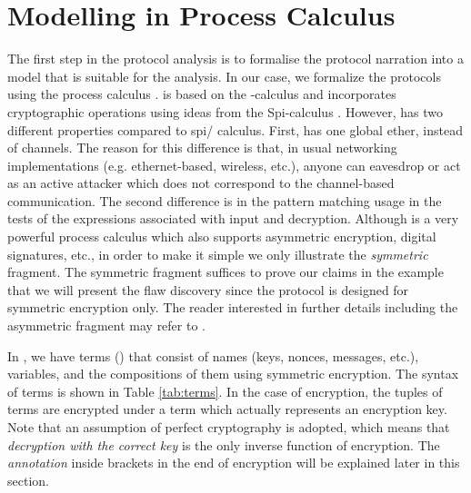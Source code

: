 \section{Modelling in \LYSA Process Calculus}
\label{lys}
The first step in the protocol analysis is to formalise the protocol
narration into a model that is suitable for the analysis.
In our case, we formalize the protocols using the \LYSA process calculus \cite{bod:1}. 
\LYSA is based on the -calculus \cite{mil} and incorporates cryptographic operations using ideas from the Spi-calculus \cite{aba:gor}. 
However, \LYSA has two different properties compared to spi/ calculus. 
First, \LYSA has one global ether, instead of channels. 
The reason for this difference is that, in usual networking implementations (e.g. ethernet-based, wireless, etc.), 
anyone can eavesdrop or act as an active attacker which does not correspond to the channel-based communication. 
The second difference is in the pattern matching usage in the tests of the expressions associated with input and decryption.
Although \LYSA is a very powerful process calculus which also supports
asymmetric encryption, digital signatures, etc., in order to make it
simple we only illustrate the \emph{symmetric} fragment. 
The symmetric fragment suffices to prove our claims in the example
that we will present the flaw discovery since the protocol is designed
for symmetric encryption only.
The reader interested in further details including the asymmetric fragment may refer to \cite{bod:1}.
 
In \LYSA, we have terms () that consist of names (keys, nonces, messages, etc.), variables, and the compositions of them using symmetric encryption. 
The syntax of terms is shown in Table \ref{tab:terms}. 
In the case of encryption, the tuples of terms  are encrypted under a term  which actually represents an encryption key. 
Note that an assumption of perfect cryptography is adopted, which means that \emph{decryption with the correct key} is the only inverse function of encryption. 
The \emph{annotation} inside brackets in the end of encryption will be explained later in this section.
 
